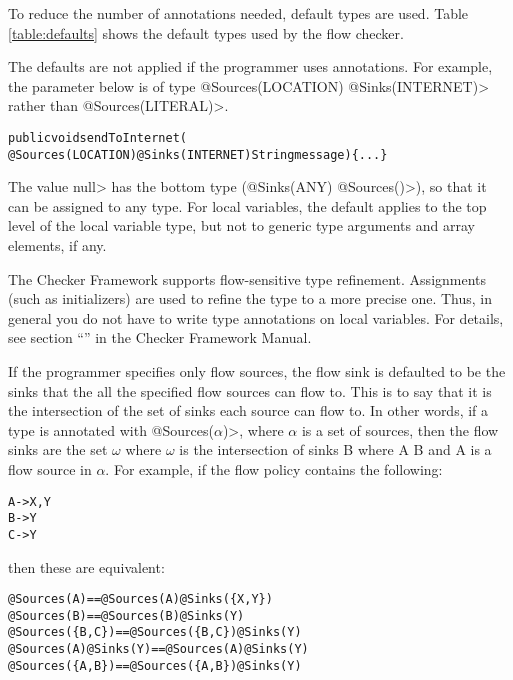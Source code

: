To reduce the number of annotations needed, default types are
used. Table \ref{table:defaults} shows the default types used by the
flow checker.


The defaults are not applied if the programmer uses annotations.  For
example, the parameter below is of type
\<@Sources(LOCATION) @Sinks(INTERNET)>
rather than  \<@Sources({LITERAL})>.

\begin{alltt}
public void sendToInternet(
    @Sources(LOCATION) @Sinks(INTERNET) String message)\{...\}
\end{alltt} 

The value \<null> has the bottom type (\<@Sinks(ANY)
@Sources(\ttcbs)>),
so that it can be assigned to any type. For local variables, the
default applies to the top level of the local variable type, but not
to generic type arguments and array elements, if any.

The Checker Framework supports flow-sensitive type refinement.  Assignments (such as
initializers) are used to refine the type to a more precise one.  Thus, in
general you do not have to write type annotations on local variables.  For
details, see section ``'' in the Checker Framework Manual.

If the programmer specifies only flow sources, the flow sink is defaulted
to be the
sinks that the all the specified flow sources can flow to. This is to say that 
it is the intersection of the set of sinks each source can flow to.
 In other words, if a type is annotated with 
\<@Sources($\alpha$)>, where $\alpha$ is a set of sources, then the flow sinks are the set 
$\omega$ where $\omega$ is the intersection of sinks B where A \flowsto{} B and A is a flow source in 
$\alpha$.  For example, if the flow policy contains the following:

\begin{alltt}
  A -> X,Y
  B -> Y
  C -> Y
\end{alltt}
  
\noindent 
then these are equivalent:

\begin{alltt}
  @Sources(A)                 ==   @Sources(A) @Sinks(\{X, Y\})
  @Sources(B)                 ==   @Sources(B) @Sinks(Y)
  @Sources(\{B,C\})             ==   @Sources(\{B,C\}) @Sinks(Y)
  @Sources(A) @Sinks(Y)   ==   @Sources(A) @Sinks(Y) 
  @Sources(\{A,B\})             ==   @Sources(\{A,B\}) @Sinks(Y)
\end{alltt}


